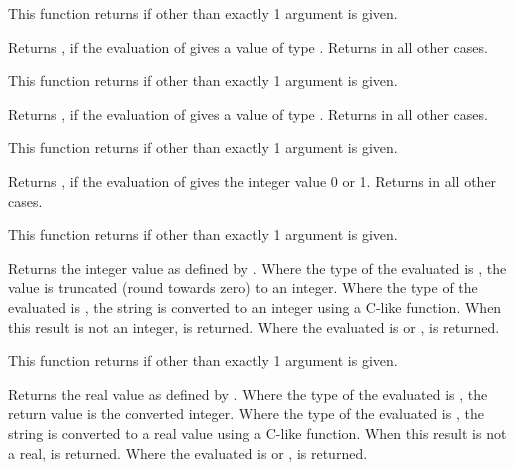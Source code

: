 \begin{description}
    This function returns  if other than exactly 1
    argument is given.

  \item[\Code{Boolean isInteger(AnyType Expr)}]
    Returns , if the evaluation of 
    gives a value of type .
    Returns  in all other cases.

    This function returns  if other than exactly 1
    argument is given.

  \item[\Code{Boolean isReal(AnyType Expr)}]
    Returns , if the evaluation of 
    gives a value of type .
    Returns  in all other cases.

    This function returns  if other than exactly 1
    argument is given.

  \item[\Code{Boolean isBoolean(AnyType Expr)}]
    Returns , if the evaluation of 
    gives the integer value 0 or 1.
    Returns  in all other cases.

    This function returns  if other than exactly 1
    argument is given.

  \item[\Code{Integer int(AnyType Expr)}]
    Returns the integer value as defined by .
    Where the type of the evaluated  is ,
    the value is truncated (round towards zero) to an integer.
    Where the type of the evaluated  is ,
    the string is converted to an integer using a C-like
     function. When this result is not an integer,
     is returned.
    Where the evaluated  is  or ,
     is returned.

    This function returns  if other than exactly 1
    argument is given.

  \item[\Code{Real real(AnyType Expr)}]
    Returns the real value as defined by .
    Where the type of the evaluated  is ,
    the return value is the converted integer.
    Where the type of the evaluated  is ,
    the string is converted to a real value using a C-like
     function. When this result is not a real,
     is returned.
    Where the evaluated  is  or ,
     is returned.


\end{description}
